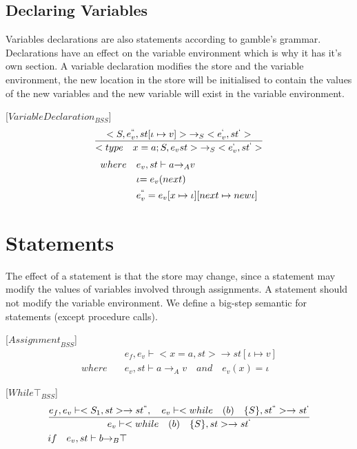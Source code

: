 \subsection*{Declaring Variables}
Variables declarations are also statements according to \gls{gamble}'s grammar.
Declarations have an effect on the variable environment which is why it has it's own section.
A variable declaration modifies the store and the variable environment, the new location in the store will be initialised to contain the values of the new variables and the new variable will exist in the variable environment.


[${VariableDeclaration}_{BSS}$]
\begin{equation}
	\frac { <S,{ e }_{ v }^{ `` },st[\iota \mapsto v]>{ \rightarrow  }_{ S }<{ e }_{ v }^{ ` },{ st }^{ ` }> }{ <type\quad x=a;S,{ e }_{ v }st>{ \rightarrow  }_{ S }<{ e }_{ v }^{ ` },{ st }^{ ` }> } 
\end{equation}
\begin{align*}
	where\quad &{ e }_{ v },st\vdash a{ \rightarrow  }_{ A }v \\
	&\iota {= e }_{ v }(next) \\
	&{ e }_{ v }^{ `` }={ e }_{ v }[x\mapsto \iota ][next\mapsto new \iota ]
\end{align*}

\section*{Statements}
The effect of a statement is that the store may change, since a statement may modify the values of variables involved through assignments.
A statement should not modify the variable environment.
We define a big-step semantic for statements (except procedure calls).

[${Assignment}_{BSS}$]
\begin{align*}
	&{ e }_{ f },{ e }_{ v }\vdash <x=a,st>\rightarrow st[\iota \mapsto v]\\
	where\quad &{ e }_{ v },st\vdash a{ \rightarrow  }_{ A }v\quad and\quad  { e }_{ v }(x)=\iota 
\end{align*}

[${While\top}_{BSS}$]
\begin{align*}
	&\frac { { e }_{ f },{ e }_{ v }\vdash <{ S }_{ 1 },st>\rightarrow { st }^{ `` },\quad { e }_{ v }\vdash <while\quad (b)\quad \{S\},{ st }^{ `` }>\rightarrow { st }^{ ` } }{ { e }_{ v }\vdash <while\quad (b)\quad \{S\},st>\rightarrow { st }^{ ` } }\\
	&if\quad { e }_{ v },st\vdash b{ \rightarrow  }_{ B }\top 
\end{align*}


